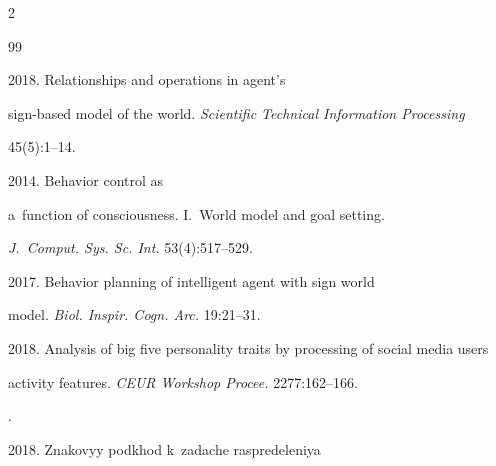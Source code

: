   \begin{multicols}{2}





\renewcommand{\bibname}{\protect\rmfamily References}







{\small\frenchspacing


 {%




 \begin{thebibliography}{99}


  




   2018. Relationships and operations in agent's 


sign-based model of the world. \textit{Scientific Technical Information Processing}


45(5):1--14.




   2014. Behavior control as 


  a~function of consciousness. I.~World model and goal setting. 


  \textit{J.~Comput. Sys. Sc. Int.} 53(4):517--529.


  




   2017. Behavior planning of intelligent agent with sign world 


model. \textit{Biol. Inspir. Cogn. Arc.} 19:21--31. 






2018. Analysis of big five personality traits by processing of social media users 


activity features. \textit{CEUR Workshop Procee.} 2277:162--166.




  . 


  2018. Znakovyy podkhod k~zadache raspredeleniya 



\end{thebibliography}}}
\end{multicols}
